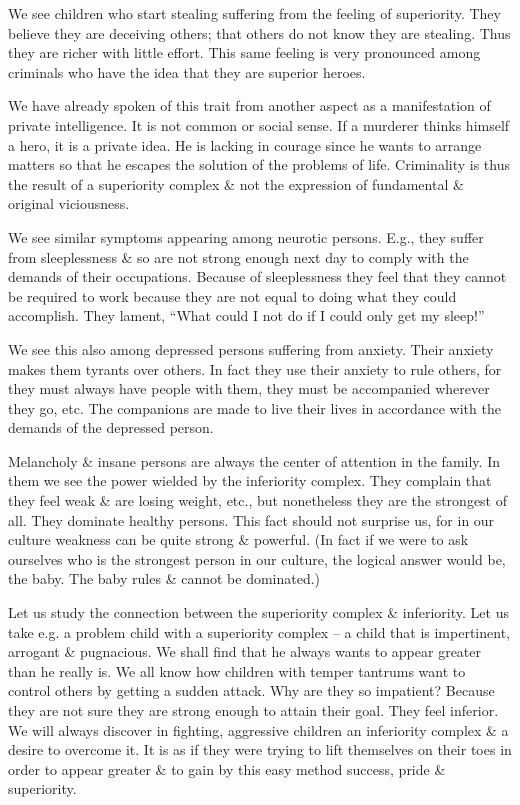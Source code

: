 \documentclass{article}
\begin{document}
We see children who start stealing suffering from the feeling of superiority. They believe they are deceiving others; that others do not know they are stealing. Thus they are richer with little effort. This same feeling is very pronounced among criminals who have the idea that they are superior heroes.

We have already spoken of this trait from another aspect as a manifestation of private intelligence. It is not common or social sense. If a murderer thinks himself a hero, it is a private idea. He is lacking in courage since he wants to arrange matters so that he escapes the solution of the problems of life. Criminality is thus the result of a superiority complex \& not the expression of fundamental \& original viciousness.

We see similar symptoms appearing among neurotic persons. E.g., they suffer from sleeplessness \& so are not strong enough next day to comply with the demands of their occupations. Because of sleeplessness they feel that they cannot be required to work because they are not equal to doing what they could accomplish. They lament, ``What could I not do if I could only get my sleep!''

We see this also among depressed persons suffering from anxiety. Their anxiety makes them tyrants over others. In fact they use their anxiety to rule others, for they must always have people with them, they must be accompanied wherever they go, etc. The companions are made to live their lives in accordance with the demands of the depressed person.

Melancholy \& insane persons are always the center of attention in the family. In them we see the power wielded by the inferiority complex. They complain that they feel weak \& are losing weight, etc., but nonetheless they are the strongest of all. They dominate healthy persons. This fact should not surprise us, for in our culture weakness can be quite strong \& powerful. (In fact if we were to ask ourselves who is the strongest person in our culture, the logical answer would be, the baby. The baby rules \& cannot be dominated.)

Let us study the connection between the superiority complex \& inferiority. Let us take e.g. a problem child with a superiority complex -- a child that is impertinent, arrogant \& pugnacious. We shall find that he always wants to appear greater than he really is. We all know how children with temper tantrums want to control others by getting a sudden attack. Why are they so impatient? Because they are not sure they are strong enough to attain their goal. They feel inferior. We will always discover in fighting, aggressive children an inferiority complex \& a desire to overcome it. It is as if they were trying to lift themselves on their toes in order to appear greater \& to gain by this easy method success, pride \& superiority.
\end{document}
